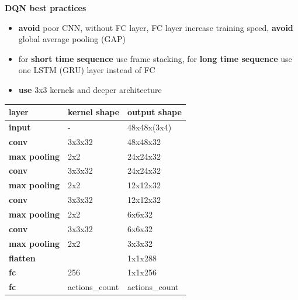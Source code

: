 \documentclass[xcolor=dvipsnames]{beamer}
\begin{document}
\begin{frame}{\bf DQN best practices}
\vspace{-5mm}

{\small
\begin{itemize}
  \item {\color{red} \bf avoid} poor CNN, without FC layer, FC layer increase training speed, {\color{red} \bf avoid} global average pooling (GAP)
  \item for {\color{green} \bf short time sequence} use frame stacking, for {\color{green} \bf long time sequence} use one LSTM (GRU) layer instead of FC
  \item {\color{green} \bf use} 3x3 kernels and deeper architecture
\end{itemize}
}

{\small

    \begin{table}[]
    \begin{tabular}{|l|l|l|}
    \hline
    \textbf{layer}       & \textbf{kernel shape} & \textbf{output shape} \\ \hline
    \rowcolor[HTML]{C0C0C0}
    \textbf{input}       & -                    & 48x48x(3x4)          \\ \hline
    \rowcolor[HTML]{FD6864}
    \textbf{conv}        & 3x3x32               & 48x48x32             \\ \hline
    \rowcolor[HTML]{9698ED}
    \textbf{max pooling} & 2x2                  & 24x24x32             \\ \hline
    \rowcolor[HTML]{FD6864}
    \textbf{conv}        & 3x3x32               & 24x24x32             \\ \hline
    \rowcolor[HTML]{9698ED}
    \textbf{max pooling} & 2x2                  & 12x12x32             \\ \hline
    \rowcolor[HTML]{FD6864}
    \textbf{conv}        & 3x3x32               & 12x12x32             \\ \hline
    \rowcolor[HTML]{9698ED}
    \textbf{max pooling} & 2x2                  & 6x6x32               \\ \hline
    \rowcolor[HTML]{FD6864}
    \textbf{conv}        & 3x3x32               & 6x6x32               \\ \hline
    \rowcolor[HTML]{9698ED}
    \textbf{max pooling} & 2x2                  & 3x3x32               \\ \hline
    \rowcolor[HTML]{C0C0C0}
    \textbf{flatten}     &                      & 1x1x288              \\ \hline
    \rowcolor[HTML]{67FD9A}
    \textbf{fc}          & 256                  & 1x1x256              \\ \hline
    \rowcolor[HTML]{67FD9A}
    \textbf{fc}          & actions\_count       & actions\_count       \\ \hline
    \end{tabular}
    \end{table}



}

\end{frame}
\end{document}
